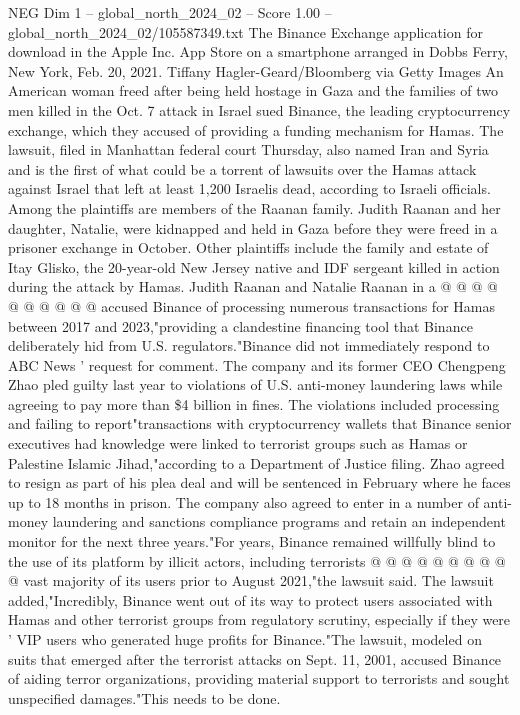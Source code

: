 \begin{textsample}{NEG Dim 1 – global\_north\_2024\_02 – Score 1.00 – global\_north\_2024\_02/105587349.txt}  \label{ex:f1_neg_182}
The Binance Exchange application for download in the Apple Inc.
App Store on a smartphone arranged in Dobbs Ferry, New York, Feb. 20, 2021.
Tiffany Hagler-Geard/Bloomberg via Getty Images An American woman freed after being held hostage in Gaza and the families of two men killed in the Oct. 7 attack in Israel sued Binance, the leading cryptocurrency exchange, which they accused of providing a funding mechanism for Hamas.
The lawsuit, filed in Manhattan federal court Thursday, also named Iran and Syria and is the first of what could be a torrent of lawsuits over the Hamas attack against Israel that left at least 1,200 Israelis dead, according to Israeli officials.
Among the plaintiffs are members of the Raanan family.
Judith Raanan and her daughter, Natalie, were kidnapped and held in Gaza before they were freed in a prisoner exchange in October.
Other plaintiffs include the family and estate of Itay Glisko, the 20-year-old New Jersey native and IDF sergeant killed in action during the attack by Hamas.
Judith Raanan and Natalie Raanan in a @ @ @ @ @ @ @ @ @ @ accused Binance of processing numerous transactions for Hamas between 2017 and 2023,"providing a clandestine financing tool that Binance deliberately hid from U.S. regulators."Binance did not immediately respond to ABC News ' request for comment.
The company and its former CEO Chengpeng Zhao pled guilty last year to violations of U.S. anti-money laundering laws while agreeing to pay more than \$4 billion in fines.
The violations included processing and failing to report"transactions with cryptocurrency wallets that Binance senior executives had knowledge were linked to terrorist groups such as Hamas or Palestine Islamic Jihad,"according to a Department of Justice filing.
Zhao agreed to resign as part of his plea deal and will be sentenced in February where he faces up to 18 months in prison.
The company also agreed to enter in a number of anti-money laundering and sanctions compliance programs and retain an independent monitor for the next three years."For years, Binance remained willfully blind to the use of its platform by illicit actors, including terrorists @ @ @ @ @ @ @ @ @ @ vast majority of its users prior to August 2021,"the lawsuit said.
The lawsuit added,"Incredibly, Binance went out of its way to protect users associated with Hamas and other terrorist groups from regulatory scrutiny, especially if they were ' VIP users who generated huge profits for Binance."The lawsuit, modeled on suits that emerged after the terrorist attacks on Sept. 11, 2001, accused Binance of aiding terror organizations, providing material support to terrorists and sought unspecified damages."This needs to be done.

\end{textsample}
